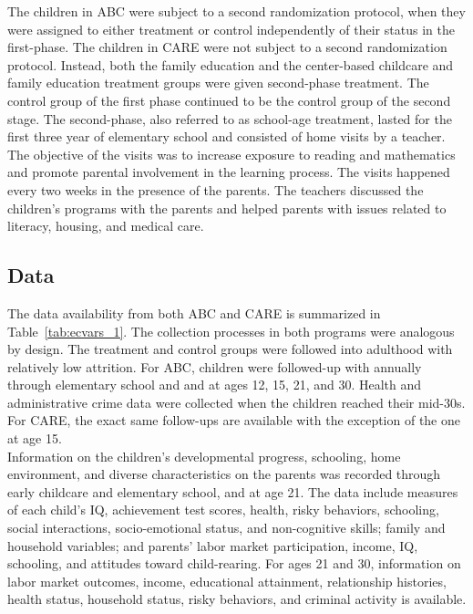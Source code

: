 \noindent The children in ABC were subject to a second randomization protocol, when they were assigned to either treatment or control independently of their status in the first-phase. The children in CARE were not subject to a second randomization protocol. Instead, both the family education and the center-based childcare and family education treatment groups were given second-phase treatment. The control group of the first phase continued to be the control group of the second stage. The second-phase, also referred to as school-age treatment, lasted for the first three year of elementary school and consisted of home visits by a teacher. The objective of the visits was to increase exposure to reading and mathematics and promote parental involvement in the learning process. The visits happened every two weeks in the presence of the parents. The teachers discussed the children's programs with the parents and helped parents with issues related to literacy, housing, and medical care.\\ 

\subsection{Data} \label{section:data}

\noindent The data availability from both ABC and CARE is summarized in Table~\ref{tab:ecvars_1}. The collection processes in both programs were analogous by design. The treatment and control groups were followed into adulthood with relatively low attrition. For ABC, children were followed-up with annually through elementary school and and at ages 12, 15, 21, and 30. Health and administrative crime data were collected when the children reached their mid-30s. For CARE, the exact same follow-ups are available with the exception of the one at age 15.\\



\noindent Information on the children’s developmental progress, schooling, home environment, and diverse characteristics on the parents was recorded through early childcare and elementary school, and at age 21. The data include measures of each child’s IQ, achievement test scores, health, risky behaviors, schooling, social interactions, socio-emotional status, and non-cognitive skills; family and household variables; and parents’ labor market participation, income, IQ, schooling, and attitudes toward child-rearing. For ages 21 and 30, information on labor market outcomes, income, educational attainment, relationship histories, health status, household status, risky behaviors, and criminal activity is available.\\

